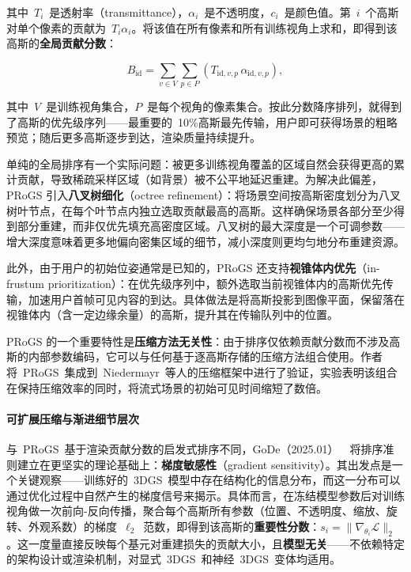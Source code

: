 其中~$T_i$~是透射率（transmittance），$\alpha_i$~是不透明度，$c_i$~是颜色值。第~$i$~个高斯对单个像素的贡献为~$T_i \alpha_i$。将该值在所有像素和所有训练视角上求和，即得到该高斯的\textbf{全局贡献分数}：

\begin{equation}
B_{\text{id}} = \sum_{v \in V}\sum_{p \in P}(T_{\text{id},v,p}\,\alpha_{\text{id},v,p}),
\end{equation}

其中~$V$~是训练视角集合，$P$~是每个视角的像素集合。按此分数降序排列，就得到了高斯的优先级序列——最重要的~10\%高斯最先传输，用户即可获得场景的粗略预览；随后更多高斯逐步到达，渲染质量持续提升。

单纯的全局排序有一个实际问题：被更多训练视角覆盖的区域自然会获得更高的累计贡献，导致稀疏采样区域（如背景）被不公平地延迟重建。为解决此偏差，PRoGS 引入\textbf{八叉树细化}（octree refinement）：将场景空间按高斯密度划分为八叉树叶节点，在每个叶节点内独立选取贡献最高的高斯。这样确保场景各部分至少得到部分重建，而非仅优先填充高密度区域。八叉树的最大深度是一个可调参数——增大深度意味着更多地偏向密集区域的细节，减小深度则更均匀地分布重建资源。

此外，由于用户的初始位姿通常是已知的，PRoGS 还支持\textbf{视锥体内优先}（in-frustum prioritization）：在优先级序列中，额外选取当前视锥体内的高斯优先传输，加速用户首帧可见内容的到达。具体做法是将高斯投影到图像平面，保留落在视锥体内（含一定边缘余量）的高斯，提升其在传输队列中的位置。

PRoGS 的一个重要特性是\textbf{压缩方法无关性}：由于排序仅依赖贡献分数而不涉及高斯的内部参数编码，它可以与任何基于逐高斯存储的压缩方法组合使用。作者将~PRoGS~集成到~Niedermayr~等人的压缩框架中进行了验证，实验表明该组合在保持压缩效率的同时，将流式场景的初始可见时间缩短了数倍。

\paragraph{可扩展压缩与渐进细节层次}

与~PRoGS~基于渲染贡献分数的启发式排序不同，GoDe（2025.01）~\cite{2501_13558}~将排序准则建立在更坚实的理论基础上：\textbf{梯度敏感性}（gradient sensitivity）。其出发点是一个关键观察——训练好的~3DGS~模型中存在结构化的信息分布，而这一分布可以通过优化过程中自然产生的梯度信号来揭示。具体而言，在冻结模型参数后对训练视角做一次前向-反向传播，聚合每个高斯所有参数（位置、不透明度、缩放、旋转、外观系数）的梯度~$\ell_2$~范数，即得到该高斯的\textbf{重要性分数}：$s_i = \|\nabla_{\theta_i} \mathcal{L}\|_2$。这一度量直接反映每个基元对重建损失的贡献大小，且\textbf{模型无关}——不依赖特定的架构设计或渲染机制，对显式~3DGS~和神经~3DGS~变体均适用。

